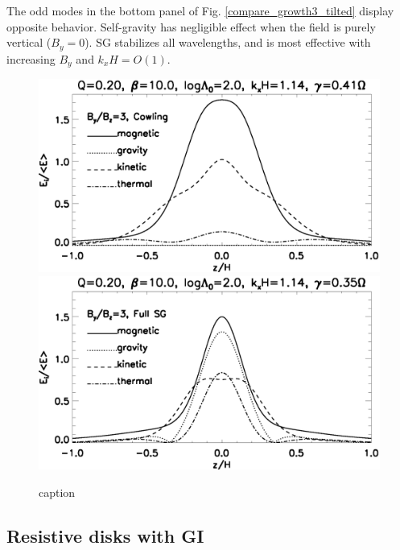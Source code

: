 The odd modes in the bottom panel of Fig. \ref{compare_growth3_tilted} 
display opposite behavior. Self-gravity has negligible effect when 
the field is purely vertical ($B_y=0$). SG stabilizes all wavelengths,
and is most effective with increasing $B_y$ and $k_xH =  O(1)$. 



\begin{figure}
  \includegraphics[width=\linewidth,clip=true,trim=0cm 1.5cm 0cm
    0cm]{figures/result_tilted_cowling.ps}  
  \includegraphics[width=\linewidth,clip=true,trim=0cm 0cm 0cm
    0.cm]{figures/result_tilted_fullsg.ps} 
  \caption{caption
    \label{result_tilted}}
\end{figure}


\subsection{Resistive disks with GI}



